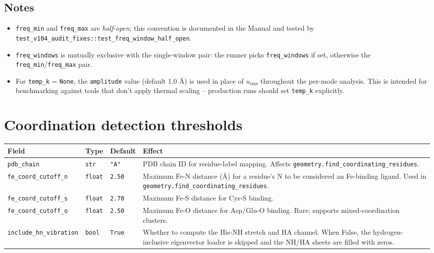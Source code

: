 \documentclass[10pt,a4paper,twoside]{article}
\newcommand{\urms}{u_{\mathrm{rms}}}
\newcommand{\fn}[1]{\texttt{#1}}
\newcommand{\cfgkey}[1]{\texttt{#1}}
\begin{document}
\subsection*{Notes}
\begin{itemize}
  \item \cfgkey{freq\_min} and \cfgkey{freq\_max} are
        \emph{half-open}; this convention is documented in the
        Manual and tested by
        \fn{test\_v104\_audit\_fixes::test\_freq\_window\_half\_open}.
  \item \cfgkey{freq\_windows} is mutually exclusive with the
        single-window pair: the runner picks
        \cfgkey{freq\_windows} if set, otherwise the
        \cfgkey{freq\_min}/\cfgkey{freq\_max} pair.
  \item For \cfgkey{temp\_k} = \texttt{None}, the
        \cfgkey{amplitude} value (default 1.0 \AA{}) is used in
        place of $\urms$ throughout the per-mode analysis. This is
        intended for benchmarking against tools that don't apply
        thermal scaling -- production runs should set
        \cfgkey{temp\_k} explicitly.
\end{itemize}

\section{Coordination detection thresholds}

\begin{longtable}{p{} p{} p{} p{}}
\toprule
\textbf{Field} & \textbf{Type} & \textbf{Default} & \textbf{Effect} \\
\midrule
\cfgkey{pdb\_chain} & \texttt{str} & \texttt{"A"}
  & PDB chain ID for residue-label mapping. Affects
    \fn{geometry.find\_coordinating\_residues}. \\
\cfgkey{fe\_coord\_cutoff\_n} & \texttt{float} & \texttt{2.50}
  & Maximum Fe-N distance (\AA{}) for a residue's N to be
    considered an Fe-binding ligand. Used in
    \fn{geometry.find\_coordinating\_residues}. \\
\cfgkey{fe\_coord\_cutoff\_s} & \texttt{float} & \texttt{2.70}
  & Maximum Fe-S distance for Cys-S binding. \\
\cfgkey{fe\_coord\_cutoff\_o} & \texttt{float} & \texttt{2.50}
  & Maximum Fe-O distance for Asp/Glu-O binding. Rare; supports
    mixed-coordination clusters. \\
\cfgkey{include\_hn\_vibration} & \texttt{bool} & \texttt{True}
  & Whether to compute the His-NH stretch and HA channel. When
    False, the hydrogen-inclusive eigenvector loader is skipped
    and the NH/HA sheets are filled with zeros. \\
\bottomrule
\end{longtable}
\end{document}
